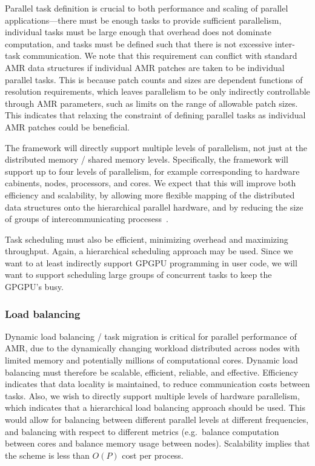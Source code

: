 \documentclass[10pt,twocolumn]{article}
\begin{document}
Parallel task definition is crucial to both performance and scaling of
parallel applications---there must be enough tasks to provide
sufficient parallelism, individual tasks must be large enough that
overhead does not dominate computation, and tasks must be defined such
that there is not excessive inter-task communication.  We note that
this requirement can conflict with standard AMR data structures if
individual AMR patches are taken to be individual parallel tasks.
This is because patch counts and sizes are dependent functions of
resolution requirements, which leaves parallelism to be only
indirectly controllable through AMR parameters, such as limits on the
range of allowable patch sizes.  This indicates that relaxing the
constraint of defining parallel tasks as individual AMR patches could
be beneficial.

The framework will directly support multiple levels of parallelism,
not just at the distributed memory / shared memory levels.
Specifically, the framework will support up to four levels of
parallelism, for example corresponding to hardware cabinents, nodes,
processors, and cores.  We expect that this will improve both
efficiency and scalability, by allowing more flexible mapping of the
distributed data structures onto the hierarchical parallel hardware,
and by reducing the size of groups of intercommunicating
procesess~\cite{BaBu09}.

Task scheduling must also be efficient, minimizing overhead and
maximizing throughput.  Again, a hierarchical scheduling approach may
be used.  Since we want to at least indirectly support GPGPU
programming in user code, we will want to support scheduling large
groups of concurrent tasks to keep the GPGPU's busy.

\subsubsection{Load balancing} \label{ss:require-balance}

Dynamic load balancing / task migration is critical for parallel
performance of AMR, due to the dynamically changing workload
distributed across nodes with limited memory and potentially millions
of computational cores.  Dynamic load balancing must therefore be
scalable, efficient, reliable, and effective.  Efficiency indicates
that data locality is maintained, to reduce communication costs
between tasks.  Also, we wish to directly support multiple levels of
hardware parallelism, which indicates that a hierarchical load
balancing approach should be used.  This would allow for balancing
between different parallel levels at different frequencies, and
balancing with respect to different metrics (e.g.~balance computation
between cores and balance memory usage between nodes).  Scalability
implies that the scheme is less than $O(P)$ cost per process.
\end{document}
